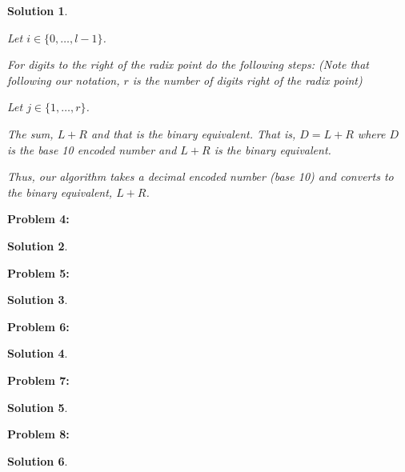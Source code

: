 \documentclass[12pt, letterpaper]{article}
\theoremstyle{nonumberplain}
\newtheorem{sol}{Solution}
\begin{document}
\begin{sol}
\begin{enumerate}[label=\alph*)]
            Let $i\in \{0, \ldots, l-1\}$.

            For digits to the right of the radix point do the following steps: (Note that following our notation, $r$ is the number of digits right of the radix point)

            Let $j\in \{1, \ldots, r\}$.

            The sum, $L+R$ and that is the binary equivalent. That is, $D = L+R$ where $D$ is the base 10 encoded number and $L+R$ is the binary equivalent. 

            Thus, our algorithm takes a decimal encoded number (base 10) and converts to the binary equivalent, $L+R$.



    \end{enumerate}
\end{sol}

\hspace{18pt}\textbf{Problem 4:} \medskip
\begin{sol}
    
\end{sol}

\hspace{18pt}\textbf{Problem 5:} \medskip
\begin{sol}
    
\end{sol}

\hspace{18pt}\textbf{Problem 6:} \medskip
\begin{sol}
    
\end{sol}

\hspace{18pt}\textbf{Problem 7:} \medskip
\begin{sol}
    
\end{sol}

\hspace{18pt}\textbf{Problem 8:} \medskip
\begin{sol}
    
\end{sol}
\end{document}
